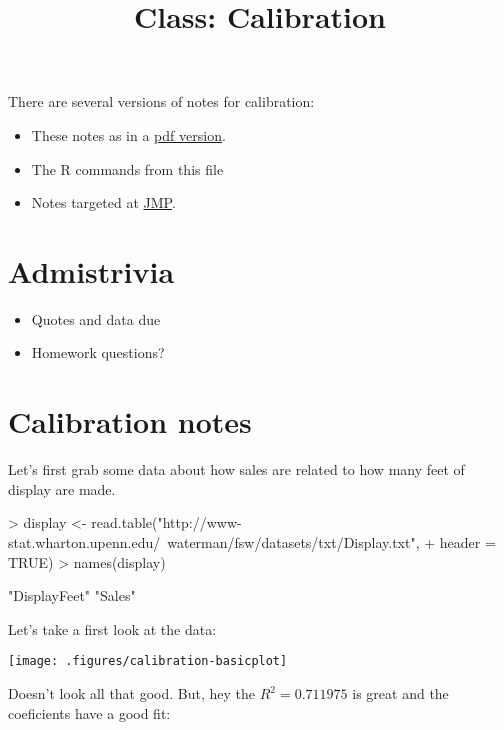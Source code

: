 \documentclass[14pt]{extarticle}
\begin{document}
\title{Class: Calibration}
\maketitle
There are several versions of notes for calibration:
\begin{itemize}
\item These notes as in a \href{class_calibration.pdf}{pdf version}.
\item The R commands from this file
\item Notes targeted at \href{calibration.pdf}{JMP}.
\end{itemize}

\section{Admistrivia}

\begin{itemize}
\item Quotes and data due
\item Homework questions?
\end{itemize}

\section{Calibration notes}

Let's first grab some data about how sales are related to how many feet of display are made.

\begin{Schunk}
\begin{Sinput}
> display <- read.table("http://www-stat.wharton.upenn.edu/~waterman/fsw/datasets/txt/Display.txt", 
+     header = TRUE)
> names(display)
\end{Sinput}
\begin{Soutput}
[1] "DisplayFeet" "Sales"      
\end{Soutput}
\end{Schunk}
Let's take a first look at the data:

\begin{Schunk}
\end{Schunk}
\texttt{[image: .figures/calibration-basicplot]}

Doesn't look all that good.  But, hey the $R^2 = 0.711975$
is great and the coeficients have a good fit:
\end{document}
